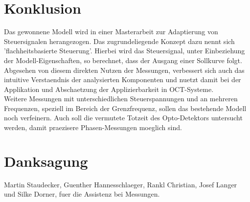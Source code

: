 \section{Konklusion}
Das gewonnene Modell wird in einer Masterarbeit zur Adaptierung von Steuersignalen herangezogen. Das zugrundeliegende Konzept dazu nennt sich 'flachheitsbasierte Steuerung'. Hierbei wird das Steuersignal, unter Einbeziehung der Modell-Eigenschaften, so berechnet, dass der Ausgang einer Sollkurve folgt. Abgesehen von diesem direkten Nutzen der Messungen, verbessert sich auch das intuitive Verstaendnis der analysierten Komponenten und nuetzt damit bei der Applikation und Abschaetzung der Applizierbarkeit in OCT-Systeme. \\
Weitere Messungen mit unterschiedlichen Steuerspannungen und an mehreren Frequenzen, 	speziell im Bereich der Grenzfrequenz, sollen das bestehende Modell noch verfeinern. Auch soll die vermutete Totzeit des Opto-Detektors untersucht werden, damit praezisere Phasen-Messungen moeglich sind.

\section*{Danksagung}
Martin Staudecker, Guenther Hannesschlaeger, Rankl Christian, Josef Langer und Silke Dorner, fuer die Assistenz bei Messungen.
\label{cha:galvoChar}
